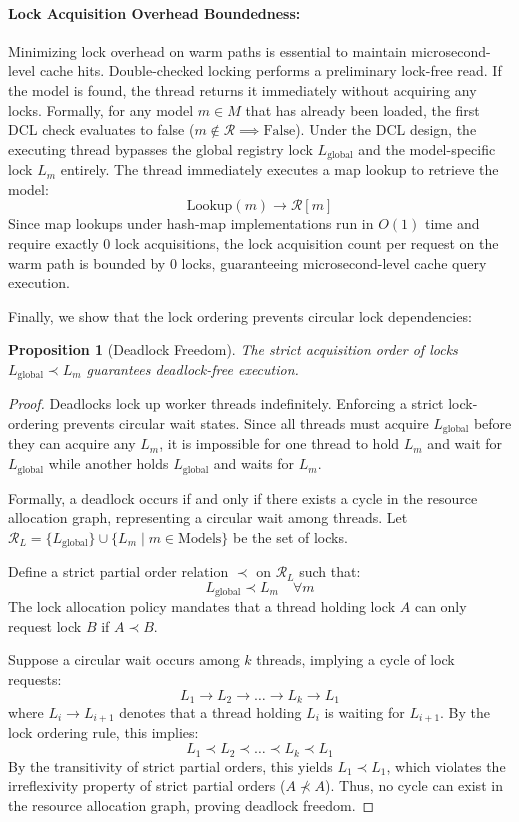 \documentclass[11pt,a4paper]{article}
\theoremstyle{plain}
\newtheorem{proposition}[theorem]{Proposition}
\theoremstyle{definition}
\theoremstyle{remark}
\newcommand{\Lm}{L_m}
\newcommand{\Lg}{L_{\mathrm{global}}}
\begin{document}
\paragraph{Lock Acquisition Overhead Boundedness:}\label{para:dcl}
Minimizing lock overhead on warm paths is essential to maintain microsecond-level cache hits. Double-checked locking performs a preliminary lock-free read. If the model is found, the thread returns it immediately without acquiring any locks.
Formally, for any model $m \in M$ that has already been loaded, the first DCL check evaluates to false ($m \notin \mathcal{R} \implies \text{False}$). Under the DCL design, the executing thread bypasses the global registry lock $\Lg$ and the model-specific lock $\Lm$ entirely. The thread immediately executes a map lookup to retrieve the model:
$$\text{Lookup}(m) \to \mathcal{R}[m]$$
Since map lookups under hash-map implementations run in $O(1)$ time and require exactly $0$ lock acquisitions, the lock acquisition count per request on the warm path is bounded by $0$ locks, guaranteeing microsecond-level cache query execution.

Finally, we show that the lock ordering prevents circular lock dependencies:

\begin{proposition}[Deadlock Freedom]\label{prop:deadlock}
The strict acquisition order of locks $\Lg \prec \Lm$ guarantees deadlock-free execution.
\end{proposition}
\begin{proof}
Deadlocks lock up worker threads indefinitely. Enforcing a strict lock-ordering prevents circular wait states. Since all threads must acquire $\Lg$ before they can acquire any $\Lm$, it is impossible for one thread to hold $\Lm$ and wait for $\Lg$ while another holds $\Lg$ and waits for $\Lm$.

Formally, a deadlock occurs if and only if there exists a cycle in the resource allocation graph, representing a circular wait among threads. Let $\mathcal{R}_L = \{\Lg\} \cup \{\Lm \mid m \in \text{Models}\}$ be the set of locks.

Define a strict partial order relation $\prec$ on $\mathcal{R}_L$ such that:
$$\Lg \prec L_m \quad \forall m$$
The lock allocation policy mandates that a thread holding lock $A$ can only request lock $B$ if $A \prec B$. 

Suppose a circular wait occurs among $k$ threads, implying a cycle of lock requests:
$$L_1 \to L_2 \to \dots \to L_k \to L_1$$
where $L_i \to L_{i+1}$ denotes that a thread holding $L_i$ is waiting for $L_{i+1}$. By the lock ordering rule, this implies:
$$L_1 \prec L_2 \prec \dots \prec L_k \prec L_1$$
By the transitivity of strict partial orders, this yields $L_1 \prec L_1$, which violates the irreflexivity property of strict partial orders ($A \not\prec A$). Thus, no cycle can exist in the resource allocation graph, proving deadlock freedom.
\end{proof}
\end{document}
